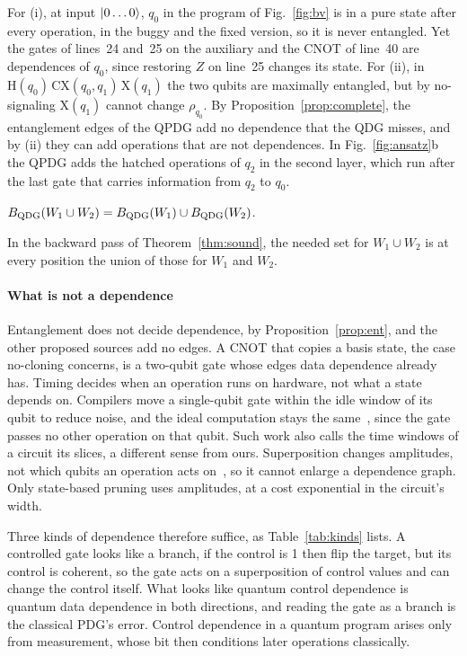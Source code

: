 For (i), at input $\lvert 0\dots0\rangle$, $q_0$ in the program of Fig.~\ref{fig:bv} is in a pure state after
every operation, in the buggy and the fixed version, so it is never entangled. Yet the gates of lines~24
and~25 on the auxiliary and the CNOT of line~40 are dependences of $q_0$, since restoring $Z$ on line~25
changes its state. For (ii), in $\mathrm{H}(q_0)\,\mathrm{CX}(q_0, q_1)\,\mathrm{X}(q_1)$ the two qubits
are maximally entangled, but by no-signaling $\mathrm{X}(q_1)$ cannot change $\rho_{q_0}$. By
Proposition~\ref{prop:complete}, the entanglement edges of the QPDG add no dependence that the QDG misses,
and by (ii) they can add operations that are not dependences. In Fig.~\ref{fig:ansatz}b the QPDG adds the
\numAnsYzExtra{} hatched operations of $q_2$ in the second layer, which run after the last gate that
carries information from $q_2$ to $q_0$.

\begin{proposition}\label{prop:joint}
$B_{\mathrm{QDG}}(W_1 \cup W_2) = B_{\mathrm{QDG}}(W_1) \cup B_{\mathrm{QDG}}(W_2)$.
\end{proposition}

\begin{IEEEproof}
In the backward pass of Theorem~\ref{thm:sound}, the needed set for $W_1 \cup W_2$ is at every position
the union of those for $W_1$ and $W_2$.
\end{IEEEproof}

\paragraph*{What is not a dependence}
Entanglement does not decide dependence, by Proposition~\ref{prop:ent}, and the other proposed sources
add no edges. A CNOT that copies a basis state, the case no-cloning concerns, is a two-qubit gate whose
edges data dependence already has. Timing decides when an operation runs on hardware, not what a state
depends on. Compilers move a single-qubit gate within the idle window of its qubit to reduce noise, and the
ideal computation stays the same~\cite{smith2022timestitch}, since the gate passes no other operation on that
qubit. Such work also calls the time windows of a circuit its slices, a different sense from ours. Superposition changes amplitudes, not which qubits an operation
acts on~\cite{nielsen2010quantum}, so it cannot enlarge a dependence graph. Only state-based pruning
uses amplitudes, at a cost exponential in the circuit's width.

Three kinds of dependence therefore suffice, as Table~\ref{tab:kinds} lists. A controlled gate looks like a
branch, if the control is 1 then flip the target, but its control is coherent, so the gate acts on a
superposition of control values and can change the control itself. What looks like quantum control
dependence is quantum data dependence in both directions, and reading the gate as a branch is the classical
PDG's error. Control dependence in a quantum program arises only from measurement, whose bit then conditions
later operations classically.

